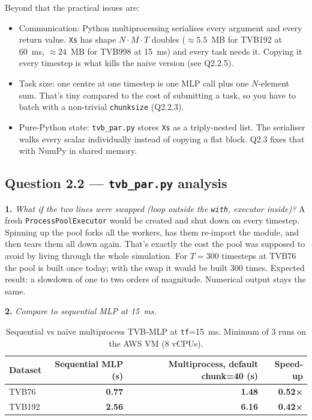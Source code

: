 \documentclass[11pt,a4paper]{article}
\newcommand{\Q}[1]{\subsection*{Question #1}}
\newcommand{\Qpart}[1]{\textbf{#1.}}
\begin{document}
Beyond that the practical issues are:

\begin{itemize}
    \item Communication: Python multiprocessing serialises every
    argument and every return value. \texttt{Xs} has shape $N \cdot M
    \cdot T$ doubles ($\approx 5.5$~MB for TVB192 at 60~ms, $\approx
    24$~MB for TVB998 at 15~ms) and every task needs it. Copying it
    every timestep is what kills the naive version (see Q2.2.5).
    \item Task size: one centre at one timestep is one MLP call plus
    one $N$-element sum. That's tiny compared to the cost of
    submitting a task, so you have to batch with a non-trivial
    \texttt{chunksize} (Q2.2.3).
    \item Pure-Python state: \texttt{tvb\_par.py} stores \texttt{Xs}
    as a triply-nested list. The serialiser walks every scalar
    individually instead of copying a flat block. Q2.3 fixes that with
    NumPy in shared memory.
\end{itemize}

\Q{2.2 — \texttt{tvb\_par.py} analysis}

\Qpart{1} \textit{What if the two lines were swapped (loop outside the
\texttt{with}, executor inside)?} A fresh
\texttt{ProcessPoolExecutor} would be created and shut down on every
timestep. Spinning up the pool forks all the workers, has them
re-import the module, and then tears them all down again. That's
exactly the cost the pool was supposed to avoid by living through the
whole simulation. For $T = 300$ timesteps at TVB76 the pool is built
once today; with the swap it would be built 300 times. Expected
result: a slowdown of one to two orders of magnitude. Numerical
output stays the same.

\Qpart{2} \textit{Compare to sequential MLP at 15~ms.}

\begin{table}[h]
\centering
\small
\begin{tabular}{lrrr}
\toprule
Dataset & Sequential MLP (s) & Multiprocess, default chunk=40 (s) & Speed-up \\
\midrule
TVB76  & \textbf{0.77}  & \textbf{1.48}  & \textbf{0.52×} \\
TVB192 & \textbf{2.56} & \textbf{6.16} & \textbf{0.42×} \\
\bottomrule
\end{tabular}
\caption{Sequential vs naïve multiprocess TVB-MLP at \texttt{tf}=15~ms.
Minimum of 3 runs on the AWS VM (8 vCPUs).}
\end{table}
\end{document}
